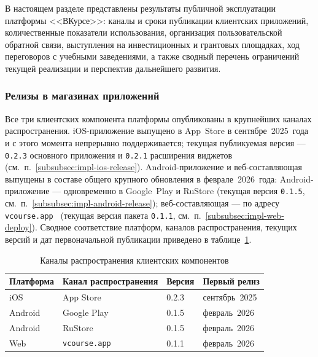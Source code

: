 В настоящем разделе представлены результаты публичной эксплуатации платформы <<ВКурсе>>: каналы и сроки публикации клиентских приложений, количественные показатели использования, организация пользовательской обратной связи, выступления на инвестиционных и грантовых площадках, ход переговоров с учебными заведениями, а также сводный перечень ограничений текущей реализации и перспектив дальнейшего развития.

\subsubsection{Релизы в магазинах приложений}
\label{subsubsec:impl-eval-releases}

Все три клиентских компонента платформы опубликованы в крупнейших каналах распространения. iOS-приложение выпущено в App~Store в сентябре~2025~года и с этого момента непрерывно поддерживается; текущая публикуемая версия --- \texttt{0.2.3} основного приложения и \texttt{0.2.1} расширения виджетов (см.~п.~\ref{subsubsec:impl-ios-release}). Android-приложение и веб-составляющая выпущены в составе общего крупного обновления в феврале~2026~года: Android-приложение --- одновременно в Google~Play и RuStore (текущая версия \texttt{0.1.5}, см.~п.~\ref{subsubsec:impl-android-release}); веб-составляющая --- по адресу \texttt{vcourse.\allowbreak app}~\cite{vcourse} (текущая версия пакета \texttt{0.1.1}, см.~п.~\ref{subsubsec:impl-web-deploy}). Сводное соответствие платформ, каналов распространения, текущих версий и дат первоначальной публикации приведено в таблице~\ref{tab:eval-channels}.

\begin{table}[h]
  \caption{Каналы распространения клиентских компонентов}
  \label{tab:eval-channels}
  \centering
  \small
  \begin{tabular}{p{} p{} p{} p{}}
    \toprule
    Платформа & Канал распространения & Версия & Первый релиз \\
    \midrule
    iOS     & App Store               & 0.2.3 & сентябрь~2025 \\
    Android & Google Play             & 0.1.5 & февраль~2026 \\
    Android & RuStore                 & 0.1.5 & февраль~2026 \\
    Web     & \texttt{vcourse.app}    & 0.1.1 & февраль~2026 \\
    \bottomrule
  \end{tabular}
\end{table}

